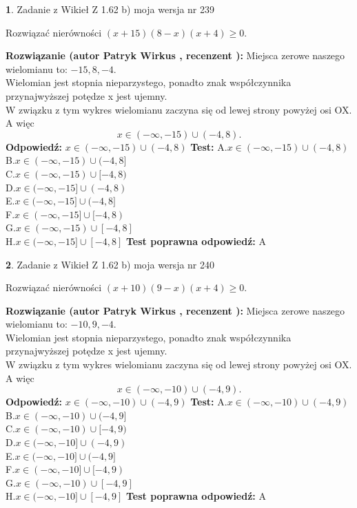 \documentclass[12pt, a4paper]{article}
\theoremstyle{definition} %
\newtheorem{zad}{}
\newcommand{\zadStart}[1]{\begin{zad}#1\newline}
\newcommand{\zadStop}{\end{zad}}
\newcommand{\rozwStart}[2]{\noindent \textbf{Rozwiązanie (autor #1 , recenzent #2): }\newline}
\newcommand{\rozwStop}{\newline}
\newcommand{\odpStart}{\noindent \textbf{Odpowiedź:}\newline}
\newcommand{\odpStop}{\newline}
\newcommand{\testStart}{\noindent \textbf{Test:}\newline}
\newcommand{\testStop}{\newline}
\newcommand{\kluczStart}{\noindent \textbf{Test poprawna odpowiedź:}\newline}
\newcommand{\kluczStop}{\newline}
\begin{document}
\zadStart{Zadanie z Wikieł Z 1.62 b) moja wersja nr 239}

Rozwiązać nierówności $(x+15)(8-x)(x+4)\ge0$.
\zadStop
\rozwStart{Patryk Wirkus}{}
Miejsca zerowe naszego wielomianu to: $-15, 8, -4$.\\
Wielomian jest stopnia nieparzystego, ponadto znak współczynnika przy\linebreak najwyższej potędze x jest ujemny.\\ W związku z tym wykres wielomianu zaczyna się od lewej strony powyżej osi OX. A więc $$x \in (-\infty,-15) \cup (-4,8).$$
\rozwStop
\odpStart
$x \in (-\infty,-15) \cup (-4,8)$
\odpStop
\testStart
A.$x \in (-\infty,-15) \cup (-4,8)$\\
B.$x \in (-\infty,-15) \cup (-4,8]$\\
C.$x \in (-\infty,-15) \cup [-4,8)$\\
D.$x \in (-\infty,-15] \cup (-4,8)$\\
E.$x \in (-\infty,-15] \cup (-4,8]$\\
F.$x \in (-\infty,-15] \cup [-4,8)$\\
G.$x \in (-\infty,-15) \cup [-4,8]$\\
H.$x \in (-\infty,-15] \cup [-4,8]$
\testStop
\kluczStart
A
\kluczStop



\zadStart{Zadanie z Wikieł Z 1.62 b) moja wersja nr 240}

Rozwiązać nierówności $(x+10)(9-x)(x+4)\ge0$.
\zadStop
\rozwStart{Patryk Wirkus}{}
Miejsca zerowe naszego wielomianu to: $-10, 9, -4$.\\
Wielomian jest stopnia nieparzystego, ponadto znak współczynnika przy\linebreak najwyższej potędze x jest ujemny.\\ W związku z tym wykres wielomianu zaczyna się od lewej strony powyżej osi OX. A więc $$x \in (-\infty,-10) \cup (-4,9).$$
\rozwStop
\odpStart
$x \in (-\infty,-10) \cup (-4,9)$
\odpStop
\testStart
A.$x \in (-\infty,-10) \cup (-4,9)$\\
B.$x \in (-\infty,-10) \cup (-4,9]$\\
C.$x \in (-\infty,-10) \cup [-4,9)$\\
D.$x \in (-\infty,-10] \cup (-4,9)$\\
E.$x \in (-\infty,-10] \cup (-4,9]$\\
F.$x \in (-\infty,-10] \cup [-4,9)$\\
G.$x \in (-\infty,-10) \cup [-4,9]$\\
H.$x \in (-\infty,-10] \cup [-4,9]$
\testStop
\kluczStart
A
\kluczStop
\end{document}
